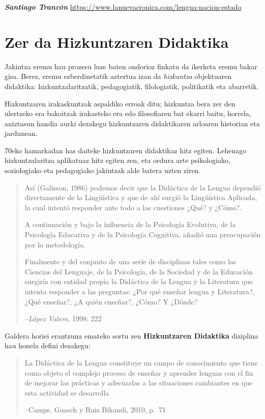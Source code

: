 \documentclass[
]{book}
\begin{document}
\emph{\textbf{Santiago Trancón }}\url{https://www.lanuevacronica.com/lengua-nacion-estado}

\hypertarget{zer-da-hizkuntzaren-didaktika}{%
\section{Zer da Hizkuntzaren Didaktika}\label{zer-da-hizkuntzaren-didaktika}}

Jakintza eremu hau prozesu luze baten ondorioz finkatu da ikerketa eremu bakar gisa. Berez, eremu ezberdinetatik aztertua izan da \emph{hizkuntza} objektuaren didaktika: hizkuntzalaritzatik, pedagogiatik, filologiatik, politikatik eta abarretik.

Hizkuntzaren irakaskuntzak aspaldiko erroak ditu; hizkuntza bera zer den ulertzeko era bakoitzak irakasteko era edo filosofiaren bat ekarri baitu, horrela, aniztasun handia aurki dezakegu hizkuntzaren didaktikaren arloaren historian eta jardunean.

70eko hamarkadan has daiteke hizkuntzaren didaktikaz hitz egiten. Lehenago hizkuntzalaritza aplikatuaz hitz egiten zen, eta ordura arte psikologiako, soziologiako eta pedagogiako jakintzak alde batera uzten ziren.

\begin{quote}
Así (Galisson, 1986) podemos decir que la Didáctica de la Lengua dependió directamente de la Lingüística y que de ahí surgió la Lingüística Aplicada, la cual intentó responder ante todo a las cuestiones ¿Qué? y ¿Cómo?.

A continuación y bajo la ínfluencia de la Psicología Evolutiva, de la Psicología Educativa y de la Psicología Cognitiva, añadió una preocupación por la metodología.

Finalmente y del conjunto de una serie de disciplinas tales como las Ciencias del Lenguaje, de la Psicología, de la Sociedad y de la Educación surgiría con entidad propia la Didáctica de la Lengua y la Literatura que intenta responder a las preguntas: ¿Por qué enseñar lengua y Literatura?, ¿Qué enseñar?, ¿A quién enseñar?, ¿Cómo? Y ¿Dónde?

--\emph{López Valero}, 1998: 222
\end{quote}

Galdera horiei erantzuna emateko sortu zen \textbf{Hizkuntzaren Didaktika} diziplina hau honela defini dezakegu:

\begin{quote}
La Didáctica de la Lengua constituye un campo de conocimiento que tiene como objeto el complejo proceso de enseñar y aprender lenguas con el fin de mejorar las prácticas y adecuarlas a las situaciones cambiantes en que esta actividad se desarrolla

--Camps, Guasch y Ruiz Bikandi, 2010, p.~71
\end{quote}
\end{document}
